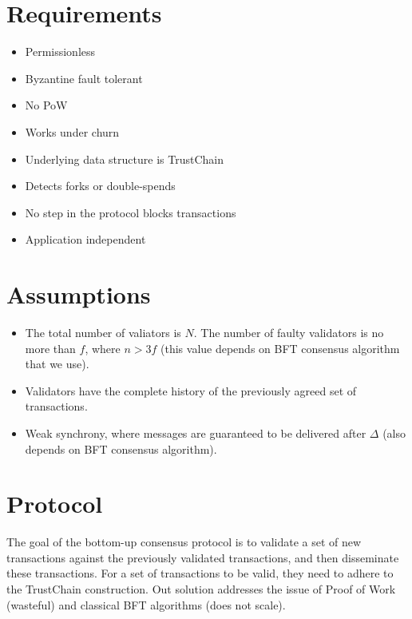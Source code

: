 \section{Requirements}
\begin{itemize}
\item Permissionless
\item Byzantine fault tolerant
\item No PoW
\item Works under churn
\item Underlying data structure is TrustChain
\item Detects forks or double-spends
\item No step in the protocol blocks transactions
\item Application independent
\end{itemize}

\section{Assumptions}
\begin{itemize}
\item The total number of valiators is $N$. The number of faulty validators is
  no more than $f$, where $n > 3f$ (this value depends on BFT consensus
  algorithm that we use).
\item Validators have the complete history of the previously agreed set of
  transactions.
\item Weak synchrony, where messages are guaranteed to be delivered after
  $\Delta$ (also depends on BFT consensus algorithm). 
\end{itemize}

\section{Protocol}
The goal of the bottom-up consensus protocol is to validate a set of new
transactions against the previously validated transactions, and then disseminate
these transactions. For a set of transactions to be valid, they need to adhere
to the TrustChain construction. Out solution addresses the issue of Proof of Work
(wasteful) and classical BFT algorithms (does not scale).

